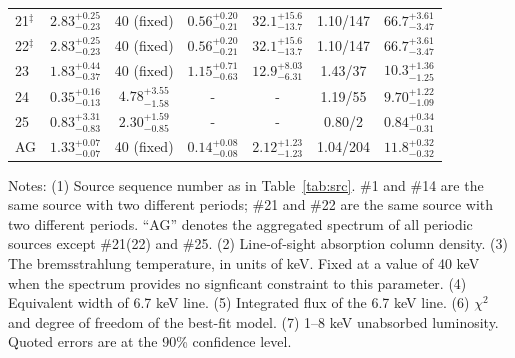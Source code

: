 \documentclass[fleqn,usenatbib]{mnras}
\begin{document}
\begin{table}
\begin{threeparttable}
\begin{spacing}{1.19}
\begin{tabular}{lcccccc}
\\
21$^\ddag$ & $2.83^{+0.25}_{-0.23}$ & 40 (fixed)  & $0.56^{+0.20}_{-0.21}$& 
$32.1^{+15.6}_{-13.7}$ & 1.10/147  & $66.7^{+3.61}_{-3.47}$
\\
22$^\ddag$ & $2.83^{+0.25}_{-0.23}$ & 40 (fixed)  &  $0.56^{+0.20}_{-0.21}$ & $32.1^{+15.6}_{-13.7}$ & 1.10/147  & $66.7^{+3.61}_{-3.47}$
\\
23 & $1.83^{+0.44}_{-0.37}$ & 40 (fixed)  & $1.15^{+0.71}_{-0.63}$  & $12.9^{+8.03}_{-6.31}$ & 1.43/37  & $10.3^{+1.36}_{-1.25}$
\\
24 & $0.35^{+0.16}_{-0.13}$ & $4.78^{+3.55}_{-1.58}$ & - &-&  1.19/55  & 
$9.70^{+1.22}_{-1.09}$
\\
25 & $0.83^{+3.31}_{-0.83}$ & $2.30^{+1.59}_{-0.85}$ &-&-&  0.80/2 & $0.84^{+0.34}_{-0.31}$ 
\\
\hline
AG & $1.33^{+0.07}_{-0.07}$ & 40 (fixed) & $0.14^{+0.08}_{-0.08}$ &$2.12^{+1.23}_{-1.23}$& 1.04/204 & $11.8^{+0.32}_{-0.32}$\\
\hline
\end{tabular}
\end{spacing}
\begin{tablenotes}
      \small
      \item
      Notes: 
      (1) Source sequence number as in Table~\ref{tab:src}. {\dag}\#1 and \#14 are the same source with two different periods; {\ddag}\#21 and \#22 are the same source with two different periods. ``AG'' denotes the aggregated spectrum of all periodic sources except \#21(22) and \#25. 
(2) Line-of-sight absorption column density.
(3) The bremsstrahlung temperature, in units of keV. Fixed at a value of 40 keV when the spectrum provides no signficant constraint to this parameter.
 (4) Equivalent width of  6.7 keV line.
 (5) Integrated flux of the 6.7 keV line.
 (6) $\chi^2$ and degree of freedom of the best-fit model.
 (7) 1--8 keV unabsorbed luminosity. Quoted errors are at the 90\% confidence level.
\end{tablenotes} 
\end{threeparttable}
\end{table} 
 
%

\end{document}
